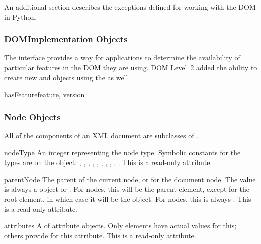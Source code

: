 An additional section describes the exceptions defined for working
with the DOM in Python.


\subsubsection{DOMImplementation Objects
               \label{dom-implementation-objects}}

The  interface provides a way for
applications to determine the availability of particular features in
the DOM they are using.  DOM Level~2 added the ability to create new
 and  objects using the
 as well.

\begin{methoddesc}[DOMImplementation]{hasFeature}{feature, version}
\end{methoddesc}


\subsubsection{Node Objects \label{dom-node-objects}}

All of the components of an XML document are subclasses of
.

\begin{memberdesc}[Node]{nodeType}
An integer representing the node type.  Symbolic constants for the
types are on the  object:
, ,
, ,
, ,
, ,
, .
This is a read-only attribute.
\end{memberdesc}

\begin{memberdesc}[Node]{parentNode}
The parent of the current node, or  for the document node.
The value is always a  object or .  For
 nodes, this will be the parent element, except for the
root element, in which case it will be the  object.
For  nodes, this is always .
This is a read-only attribute.
\end{memberdesc}

\begin{memberdesc}[Node]{attributes}
A  of attribute objects.  Only elements have
actual values for this; others provide  for this attribute.
This is a read-only attribute.
\end{memberdesc}


